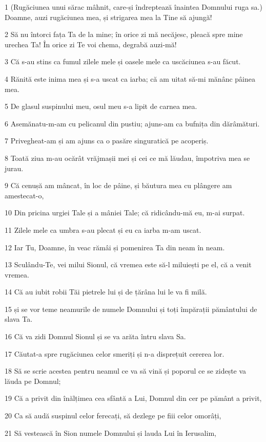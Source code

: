 \par 1 (Rugăciunea unui sărac mâhnit, care-și îndreptează înaintea Domnului ruga sa.) Doamne, auzi rugăciunea mea, și strigarea mea la Tine să ajungă!
\par 2 Să nu întorci fața Ta de la mine; în orice zi mă necăjesc, pleacă spre mine urechea Ta! În orice zi Te voi chema, degrabă auzi-mă!
\par 3 Că s-au stins ca fumul zilele mele și oasele mele ca uscăciunea s-au făcut.
\par 4 Rănită este inima mea și s-a uscat ca iarba; că am uitat să-mi mănânc pâinea mea.
\par 5 De glasul suspinului meu, osul meu s-a lipit de carnea mea.
\par 6 Asemănatu-m-am cu pelicanul din pustiu; ajuns-am ca bufnița din dărâmături.
\par 7 Privegheat-am și am ajuns ca o pasăre singuratică pe acoperiș.
\par 8 Toată ziua m-au ocărât vrăjmașii mei și cei ce mă lăudau, împotriva mea se jurau.
\par 9 Că cenușă am mâncat, în loc de pâine, și băutura mea cu plângere am amestecat-o,
\par 10 Din pricina urgiei Tale și a mâniei Tale; că ridicându-mă eu, m-ai surpat.
\par 11 Zilele mele ca umbra s-au plecat și eu ca iarba m-am uscat.
\par 12 Iar Tu, Doamne, în veac rămâi și pomenirea Ta din neam în neam.
\par 13 Sculându-Te, vei milui Sionul, că vremea este să-l miluiești pe el, că a venit vremea.
\par 14 Că au iubit robii Tăi pietrele lui și de țărâna lui le va fi milă.
\par 15 și se vor teme neamurile de numele Domnului și toți împărații pământului de slava Ta.
\par 16 Că va zidi Domnul Sionul și se va arăta întru slava Sa.
\par 17 Căutat-a spre rugăciunea celor smeriți și n-a disprețuit cererea lor.
\par 18 Să se scrie acestea pentru neamul ce va să vină și poporul ce se zidește va lăuda pe Domnul;
\par 19 Că a privit din înălțimea cea sfântă a Lui, Domnul din cer pe pământ a privit,
\par 20 Ca să audă suspinul celor ferecați, să dezlege pe fiii celor omorâți,
\par 21 Să vestească în Sion numele Domnului și lauda Lui în Ierusalim,
